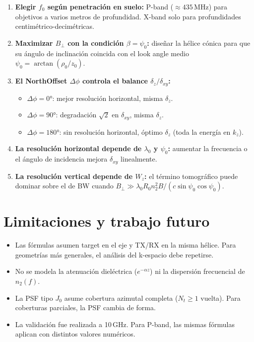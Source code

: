 \documentclass[12pt,a4paper,oneside]{book}
\begin{document}
\begin{enumerate}
  \item \textbf{Elegir $f_0$ según penetración en suelo:} P-band ($\approx 435\,\text{MHz}$) para objetivos a varios metros de profundidad. X-band solo para profundidades centimétrico-decimétricas.

  \item \textbf{Maximizar $B_\perp$ con la condición $\beta = \psi_0$:} diseñar la hélice cónica para que su ángulo de inclinación coincida con el look angle medio $\psi_0 = \arctan(\rho_0/z_0)$.

  \item \textbf{El NorthOffset $\Delta\phi$ controla el balance $\delta_z/\delta_{xy}$:}
  \begin{itemize}
    \item $\Delta\phi = 0°$: mejor resolución horizontal, misma $\delta_z$.
    \item $\Delta\phi = 90°$: degradación $\sqrt{2}$ en $\delta_{xy}$, misma $\delta_z$.
    \item $\Delta\phi = 180°$: sin resolución horizontal, óptimo $\delta_z$ (toda la energía en $k_z$).
  \end{itemize}

  \item \textbf{La resolución horizontal depende de $\lambda_0$ y $\psi_0$:} aumentar la frecuencia o el ángulo de incidencia mejora $\delta_{xy}$ linealmente.

  \item \textbf{La resolución vertical depende de $W_z$:} el término tomográfico puede dominar sobre el de BW cuando $B_\perp \gg \lambda_0 R_0 n_2^2 B/(c\sin\psi_0\cos\psi_0)$.
\end{enumerate}

\section{Limitaciones y trabajo futuro}

\begin{itemize}
  \item Las fórmulas asumen target en el eje y TX/RX en la misma hélice. Para geometrías más generales, el análisis del k-espacio debe repetirse.
  \item No se modela la atenuación dieléctrica ($e^{-\alpha z}$) ni la dispersión frecuencial de $n_2(f)$.
  \item La PSF tipo $J_0$ asume cobertura azimutal completa ($N_t \geq 1$ vuelta). Para coberturas parciales, la PSF cambia de forma.
  \item La validación fue realizada a 10\,GHz. Para P-band, las mismas fórmulas aplican con distintos valores numéricos.
\end{itemize}
\end{document}
